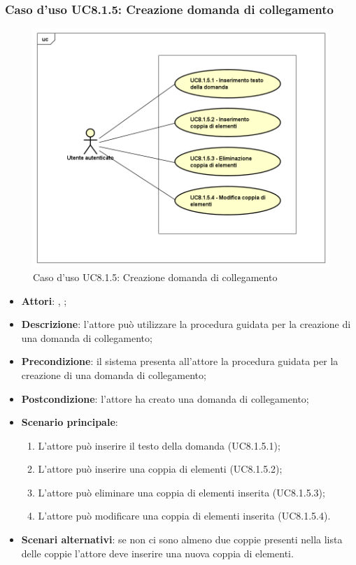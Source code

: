 \subsubsection{Caso d'uso UC8.1.5: Creazione domanda di collegamento}
\label{UC8.1.5}
\begin{figure}[h]
	\centering
\includegraphics[scale=0.5,keepaspectratio]{UML/UC8_1_5.png}
	\caption{Caso d'uso UC8.1.5: Creazione domanda di collegamento}
\end{figure}
\FloatBarrier
\begin{itemize}
	\item \textbf{Attori}: \uau, \uaupro;
	\item \textbf{Descrizione}: l'attore può utilizzare la procedura guidata per la creazione di una domanda di collegamento; 
	\item \textbf{Precondizione}: il sistema presenta all'attore la procedura guidata per la creazione di una domanda di collegamento;
	\item \textbf{Postcondizione}: l'attore ha creato una domanda di collegamento;
	\item \textbf{Scenario principale}: 
		\begin{enumerate}
			\item L'attore può inserire il testo della domanda (UC8.1.5.1);
			\item L'attore può inserire una coppia di elementi (UC8.1.5.2);
			\item L'attore può eliminare una coppia di elementi inserita (UC8.1.5.3);
			\item L'attore può modificare una coppia di elementi inserita (UC8.1.5.4).
		\end{enumerate}
	\item \textbf{Scenari alternativi}: se non ci sono almeno due coppie presenti nella lista delle coppie l'attore deve inserire una nuova coppia di elementi.
\end{itemize}

